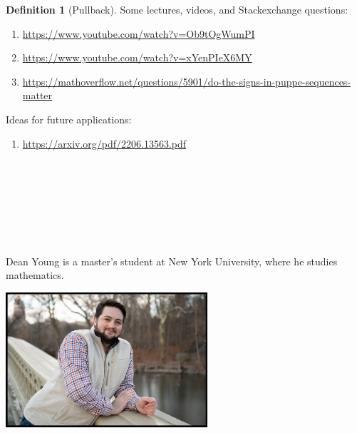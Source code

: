 \documentclass{book}
\theoremstyle{definition}
\newtheorem{definition}{Definition}
\newcounter{lcounter}
\begin{document}
\begin{definition}[Pullback]
Some lectures, videos, and Stackexchange questions:

\begin{enumerate}
\item \url{https://www.youtube.com/watch?v=Ob9tOgWumPI}
\item \url{https://www.youtube.com/watch?v=xYenPIeX6MY}
\item \url{https://mathoverflow.net/questions/5901/do-the-signs-in-puppe-sequences-matter}
\end{enumerate}

Ideas for future applications:

\begin{enumerate}
\item \url{https://arxiv.org/pdf/2206.13563.pdf}
\end{enumerate}





\newpage 
\ \\
\ \\
\ \\
\ \\
\ \\
\ \\
\begin{center}
\begin{tcolorbox}[width=5in,colback={white},title={\begin{center}\texttt{About the Author} \addtocounter{lcounter}{1}  \end{center}},colbacktitle=Yellow,coltitle=black]
Dean Young is a master's student at New York University, where he studies mathematics. \\
\begin{center}
\includegraphics[width=7.5cm,height=5cm]{about.jpg}
\end{center}
\end{tcolorbox}
\end{center}


\end{definition}
\end{document}
